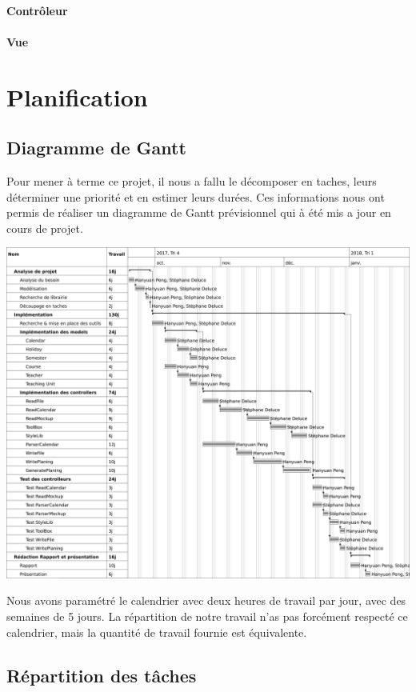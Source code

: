 \documentclass{polytech/polytech}
\begin{document}
	\subsubsection{Contrôleur}

	\subsubsection{Vue}

	\chapter{Planification}

	\section{Diagramme de Gantt}
	
	Pour mener à terme ce projet, il nous a fallu le décomposer en taches, leurs déterminer une priorité et en estimer leurs durées. Ces informations nous ont permis de réaliser un diagramme de Gantt prévisionnel qui à été mis a jour en cours de projet.
	
	\includegraphics[width=\textwidth]{./img/Gantt.png}

	Nous avons paramétré le calendrier avec deux heures de travail par jour, avec des semaines de 5 jours.
	La répartition de notre travail n'as pas forcément respecté ce calendrier, mais la quantité de travail fournie est équivalente.
	
	\section{Répartition des tâches}
\end{document}
